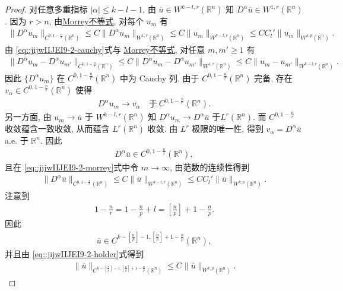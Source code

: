 \documentclass[../../main.tex]{subfiles}
\begin{document}
\begin{proof}
对任意多重指标 $|\alpha|\leqslant k-l-1$, 由 $\overline{u}\in W^{k-l,r}(\mathbb{R}^{n})$ 知 $D^{\alpha}\overline{u}\in W^{1,r}(\mathbb{R}^{n})$. 因为 $r>n$, 由\hyperref[theorem:Morrey不等式]{Morrey不等式}, 对每个 $u_{m}$ 有
\begin{align}\label{eq::jijwIIJEI9-2-morrey}
\|D^{\alpha}u_{m}\|_{C^{0,1-\frac{n}{r}}(\mathbb{R}^{n})}\leqslant C\|D^{\alpha}u_{m}\|_{W^{1,r}(\mathbb{R}^{n})}\leqslant C\|u_{m}\|_{W^{k-l,r}(\mathbb{R}^{n})}\leqslant CC_{l}'\|u_{m}\|_{W^{k,p}(\mathbb{R}^{n})}.
\end{align}
由 \eqref{eq::jijwIIJEI9-2-cauchy}式与 \hyperref[theorem:Morrey不等式]{Morrey不等式}, 对任意 $m,m'\geqslant1$ 有
\begin{align*}
\|D^{\alpha}u_{m}-D^{\alpha}u_{m'}\|_{C^{0,1-\frac{n}{r}}(\mathbb{R}^{n})}\leqslant C\|D^{\alpha}u_{m}-D^{\alpha}u_{m'}\|_{W^{1,r}(\mathbb{R}^{n})}\leqslant C\|u_{m}-u_{m'}\|_{W^{k-l,r}(\mathbb{R}^{n})}.
\end{align*}
因此 $\{D^{\alpha}u_{m}\}$ 在 $C^{0,1-\frac{n}{r}}(\mathbb{R}^{n})$ 中为 Cauchy 列. 由于 $C^{0,1-\frac{n}{r}}(\mathbb{R}^{n})$ 完备, 存在 $v_{\alpha}\in C^{0,1-\frac{n}{r}}(\mathbb{R}^{n})$ 使得
\begin{align*}
D^{\alpha}u_{m}\to v_{\alpha}\quad\text{于}\ C^{0,1-\frac{n}{r}}(\mathbb{R}^{n}).
\end{align*}
另一方面, 由 $u_{m}\to\overline{u}$ 于 $W^{k-l,r}(\mathbb{R}^{n})$ 知 $D^{\alpha}u_{m}\to D^{\alpha}\overline{u}$ 于$L^{r}(\mathbb{R}^{n})$. 而 $C^{0,1-\frac{n}{r}}$ 收敛蕴含一致收敛, 从而蕴含 $L^{r}(\mathbb{R}^{n})$ 收敛. 由 $L^{r}$ 极限的唯一性, 得到 $v_{\alpha}=D^{\alpha}\overline{u}$ a.e. 于 $\mathbb{R}^{n}$. 因此
\begin{align*}
D^{\alpha}\overline{u}\in C^{0,1-\frac{n}{r}}(\mathbb{R}^{n}),
\end{align*}
且在 \eqref{eq::jijwIIJEI9-2-morrey}式中令 $m\to\infty$, 由范数的连续性得到
\begin{align}\label{eq::jijwIIJEI9-2-holder}
\|D^{\alpha}\overline{u}\|_{C^{0,1-\frac{n}{r}}(\mathbb{R}^{n})}\leqslant C\|\overline{u}\|_{W^{k-l,r}(\mathbb{R}^{n})}\leqslant CC_{l}'\|\overline{u}\|_{W^{k,p}(\mathbb{R}^{n})}.
\end{align}
注意到
\begin{align*}
1-\frac{n}{r}=1-\frac{n}{p}+l=\left[\frac{n}{p}\right]+1-\frac{n}{p}.
\end{align*}
因此
\begin{align*}
\overline{u}\in C^{k-\left[\frac{n}{p}\right]-1,\left[\frac{n}{p}\right]+1-\frac{n}{p}}(\mathbb{R}^{n}),
\end{align*}
并且由 \eqref{eq::jijwIIJEI9-2-holder}式得到
\begin{align}\label{eq::jijwIIJEI9-2-final}
\|\overline{u}\|_{C^{k-\left[\frac{n}{p}\right]-1,\left[\frac{n}{p}\right]+1-\frac{n}{p}}(\mathbb{R}^{n})}\leqslant C\|\overline{u}\|_{W^{k,p}(\mathbb{R}^{n})}.
\end{align}


\end{proof}
\end{document}
